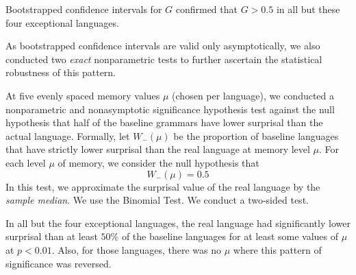 Bootstrapped confidence intervals for $G$ confirmed that $G>0.5$ in all but these four exceptional languages.

As bootstrapped confidence intervals are valid only asymptotically, we also conducted two \emph{exact} nonparametric tests to further ascertain the statistical robustness of this pattern.


At five evenly spaced memory values $\mu$ (chosen per language), we conducted a nonparametric and nonasymptotic significance hypothesis test against the null hypothesis that half of the baseline grammars have lower surprisal than the actual language. %
Formally, let $W_-(\mu)$ be the proportion of baseline languages that have strictly lower surprisal than the real language at memory level $\mu$.
For each level $\mu$ of memory, we consider the null hypothesis that
\begin{equation}
	W_-(\mu) = 0.5
\end{equation}
In this test, we approximate the surprisal value of the real language by the \emph{sample median}.
We use the Binomial Test.
We conduct a two-sided test.

In all but the four exceptional languages, the real language had significantly lower surprisal than at least $50\%$ of the baseline languages for at least some values of $\mu$ at $p < 0.01$.
Also, for those languages, there was no $\mu$ where this pattern of significance was reversed.




